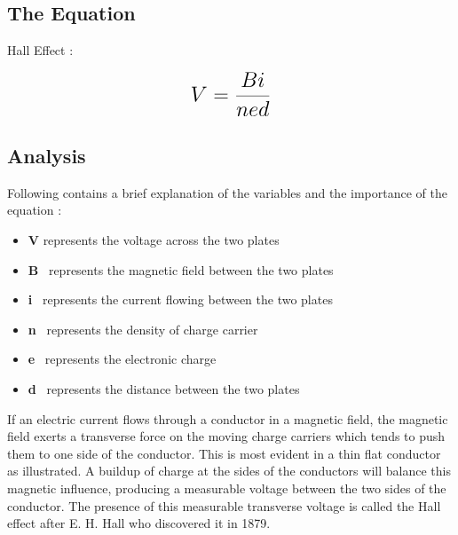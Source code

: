 \subsection{The Equation}



Hall Effect  :  

\begin{equation}
 {\LARGE{\textbf{$V =\frac{Bi}{{ned}}$}}}
 \label{eqn:equation}
\end{equation}


\subsection{Analysis}
Following contains a brief explanation of the variables and the importance of the equation :
\begin{itemize}

{\normalsize {The above given equation \ref{eqn:equation} has terms \textbf{V} ,\textbf{B} , \textbf{i} ,\textbf{n} ,\textbf{e} and  \textbf{d}.}}

{\normalsize { Here,}}\\
\item {\normalsize {\textbf{V} represents the voltage across the two plates }}\\
\item {\normalsize {\textbf{B} \  represents the magnetic field between the two plates}}\\
\item {\normalsize {\textbf{i} \  represents the current flowing between the two plates}}\\
\item {\normalsize {\textbf{n} \  represents the density of charge carrier}}\\
\item {\normalsize{\textbf{e} \ represents the electronic charge}}\\
\item {\normalsize{\textbf{d} \ represents the distance between the two plates}}
\end{itemize}



If an electric current flows through a conductor in a magnetic field, the magnetic field exerts a transverse force on the moving charge carriers which tends to push them to one side of the conductor. This is most evident in a thin flat conductor as illustrated. A buildup of charge at the sides of the conductors will balance this magnetic influence, producing a measurable voltage between the two sides of the conductor. The presence of this measurable transverse voltage is called the Hall effect after E. H. Hall who discovered it in 1879.

